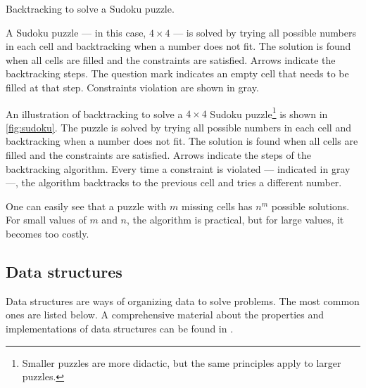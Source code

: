 \begin{figurebox}[label=fig:sudoku]{Backtracking to solve a Sudoku puzzle.}
{
  }
  \tcblower
  A Sudoku puzzle --- in this case, $4 \times 4$ --- is solved by trying all possible
  numbers in each cell and backtracking when a number does not fit.  The solution is found
  when all cells are filled and the constraints are satisfied.  Arrows indicate the
  backtracking steps.  The question mark indicates an empty cell that needs to be filled
  at that step.  Constraints violation are shown in gray.
\end{figurebox}

An illustration of backtracking to solve a $4 \times 4$ Sudoku puzzle\footnote{%
Smaller puzzles are more didactic, but the same principles apply to larger puzzles.}
is shown in \cref{fig:sudoku}.
The puzzle is solved by trying all possible numbers in each cell and backtracking when a
number does not fit.  The solution is found when all cells are filled and the constraints
are satisfied.  Arrows indicate the steps of the backtracking algorithm.  Every time a
constraint is violated --- indicated in gray ---, the algorithm backtracks to the previous
cell and tries a different number.

One can easily see that a puzzle with $m$ missing cells has $n^m$ possible solutions.  For
small values of $m$ and $n$, the algorithm is practical, but for large values, it becomes
too costly.

\subsection{Data structures}

Data structures are ways of organizing data to solve problems.  The most common ones
are listed below.  A comprehensive material about the properties and implementations of
data structures can be found in \textcite{Cormen2022}.

